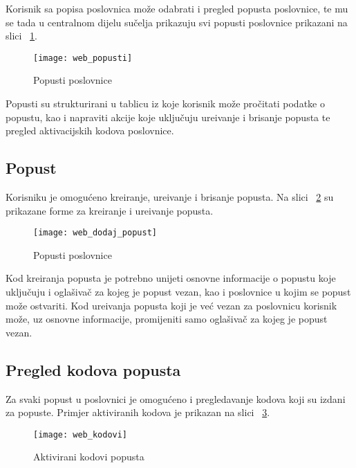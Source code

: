 Korisnik sa popisa poslovnica mo\v{z}e odabrati i pregled popusta poslovnice, te mu se tada u centralnom dijelu su\v{c}elja prikazuju svi popusti poslovnice prikazani na slici ~\ref{fig:web_popusti}.

\begin{figure}[!htbp]
	\begin{center}
 \texttt{[image: web\_popusti]}
 \caption{Popusti poslovnice}
 \label{fig:web_popusti}
	\end{center}
\end{figure}

Popusti su strukturirani u tablicu iz koje korisnik mo\v{z}e pro\v{c}itati podatke o popustu, kao i napraviti akcije koje uklju\v{c}uju ure\dj ivanje i brisanje popusta te pregled aktivacijskih kodova poslovnice.


\subsection{Popust}

Korisniku je omogu\'{c}eno kreiranje, ure\dj ivanje i brisanje popusta. Na slici ~\ref{fig:web_dodaj_popust} su prikazane forme za kreiranje i ure\dj ivanje popusta.

\begin{figure}[!htbp]
	\begin{center}
 \texttt{[image: web\_dodaj\_popust]}
 \caption{Popusti poslovnice}
 \label{fig:web_dodaj_popust}
	\end{center}
\end{figure}
Kod kreiranja popusta je potrebno unijeti osnovne informacije o popustu koje uklju\v{c}uju i ogla\v{s}iva\v{c} za kojeg je popust vezan, kao i poslovnice u kojim se popust mo\v{z}e ostvariti. Kod ure\dj ivanja popusta koji je ve\'{c} vezan za poslovnicu korisnik mo\v{z}e, uz osnovne informacije, promijeniti samo ogla\v{s}iva\v{c} za kojeg je popust vezan.


\subsection{Pregled kodova popusta}
Za svaki popust u poslovnici je omogu\'{c}eno i pregledavanje kodova koji su izdani za popuste. Primjer aktiviranih kodova je prikazan na slici ~\ref{fig:web_kodovi}.

\begin{figure}[!htbp]
	\begin{center}
 \texttt{[image: web\_kodovi]}
 \caption{Aktivirani kodovi popusta}
 \label{fig:web_kodovi}
	\end{center}
\end{figure}

